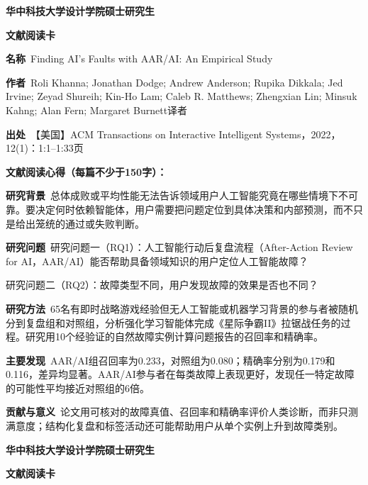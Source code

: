 \begin{center}
{\songti\bfseries\fontsize{18.5pt}{27.75pt}\selectfont 华中科技大学设计学院硕士研究生\par}
{\songti\bfseries\fontsize{18.5pt}{27.75pt}\selectfont 文献阅读卡\par}
\end{center}
\vspace{0.25em}
\noindent\underline{}\par
\vspace{0.35em}
\noindent\textbf{名称}\ Finding AI's Faults with AAR/AI: An Empirical Study\par
\noindent\textbf{作者}\ Roli Khanna; Jonathan Dodge; Andrew Anderson; Rupika Dikkala; Jed Irvine; Zeyad Shureih; Kin-Ho Lam; Caleb R. Matthews; Zhengxian Lin; Minsuk Kahng; Alan Fern; Margaret Burnett\quad 译者\par
\noindent\textbf{出处}\ 【美国】ACM Transactions on Interactive Intelligent Systems，2022，12(1)：1:1–1:33\quad 页\par
\vspace{0.35em}
\noindent\textbf{文献阅读心得（每篇不少于150字）：}\par
\noindent\textbf{研究背景}\ 总体成败或平均性能无法告诉领域用户人工智能究竟在哪些情境下不可靠。要决定何时依赖智能体，用户需要把问题定位到具体决策和内部预测，而不只是给出笼统的通过或失败判断。\par
\noindent\textbf{研究问题}\ 研究问题一（RQ1）：人工智能行动后复盘流程（After-Action Review for AI，AAR/AI）能否帮助具备领域知识的用户定位人工智能故障？\par
研究问题二（RQ2）：故障类型不同，用户发现故障的效果是否也不同？\par
\noindent\textbf{研究方法}\ 65名有即时战略游戏经验但无人工智能或机器学习背景的参与者被随机分到复盘组和对照组，分析强化学习智能体完成《星际争霸II》拉锯战任务的过程。研究用10个经验证的自然故障实例计算问题报告的召回率和精确率。\par
\noindent\textbf{主要发现}\ AAR/AI组召回率为0.233，对照组为0.080；精确率分别为0.179和0.116，差异均显著。AAR/AI参与者在每类故障上表现更好，发现任一特定故障的可能性平均接近对照组的6倍。\par
\noindent\textbf{贡献与意义}\ 论文用可核对的故障真值、召回率和精确率评价人类诊断，而非只测满意度；结构化复盘和标签活动还可能帮助用户从单个实例上升到故障类别。\par
\clearpage
\begin{center}
{\songti\bfseries\fontsize{18.5pt}{27.75pt}\selectfont 华中科技大学设计学院硕士研究生\par}
{\songti\bfseries\fontsize{18.5pt}{27.75pt}\selectfont 文献阅读卡\par}
\end{center}
